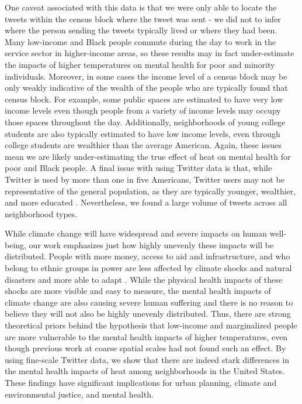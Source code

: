 \documentclass[fleqn,10pt]{wlscirep}
\begin{document}
One caveat associated with this data is that we were only able to locate the tweets within the census block where the tweet was sent - we did not to infer where the person sending the tweets typically lived or where they had been.  Many low-income and Black people commute during the day to work in the service sector in higher-income areas, so these results may in fact under-estimate the impacts of higher temperatures on mental health for poor and minority individuals.  Moreover, in some cases the income level of a census block may be only weakly indicative of the wealth of the people who are typically found that census block.  For example, some public spaces are estimated to have very low income levels even though people from a variety of income levels may occupy those spaces throughout the day.  Additionally, neighborhoods of young college students are also typically estimated to have low income levels, even through college students are wealthier than the average American.  Again, these issues mean we are likely under-estimating the true effect of heat on mental health for poor and Black people.  A final issue with using Twitter data is that, while Twitter is used by more than one in five Americans, Twitter users may not be representative of the general population, as they are typically younger, wealthier, and more educated \cite{Pew2020Sep}.  Nevertheless, we found a large volume of tweets across all neighborhood types.

While climate change will have widespread and severe impacts on human well-being, our work emphasizes just how highly unevenly these impacts will be distributed. People with more money, access to aid and infrastructure, and who belong to ethnic groups in power are less affected by climate shocks and natural disasters and more able to adapt \cite{bullard2012wrong}. While the physical health impacts of these shocks are more visible and easy to measure, the mental health impacts of climate change are also causing severe human suffering and there is no reason to believe they will not also be highly unevenly distributed.  Thus, there are strong theoretical priors behind the hypothesis that low-income and marginalized people are more vulnerable to the mental health impacts of higher temperatures, even though previous work at coarse spatial scales had not found such an effect.  By using fine-scale Twitter data, we show that there are indeed stark differences in the mental health impacts of heat among neighborhoods in the United States.  These findings have significant implications for urban planning, climate and environmental justice, and mental health.
\end{document}
